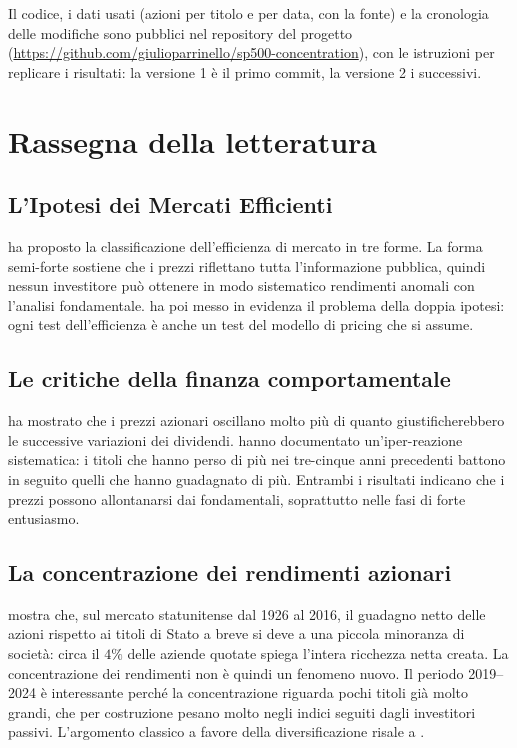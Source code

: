 \documentclass[12pt, a4paper]{article}
\begin{document}
Il codice, i dati usati (azioni per titolo e per data, con la fonte) e la cronologia delle modifiche sono pubblici nel repository del progetto (\url{https://github.com/giulioparrinello/sp500-concentration}), con le istruzioni per replicare i risultati: la versione 1 \`e il primo commit, la versione 2 i successivi.

\section{Rassegna della letteratura}

\subsection{L'Ipotesi dei Mercati Efficienti}

\citet{fama1970} ha proposto la classificazione dell'efficienza di mercato in tre forme. La forma semi-forte sostiene che i prezzi riflettano tutta l'informazione pubblica, quindi nessun investitore pu\`o ottenere in modo sistematico rendimenti anomali con l'analisi fondamentale. \citet{fama1991} ha poi messo in evidenza il problema della doppia ipotesi: ogni test dell'efficienza \`e anche un test del modello di pricing che si assume.

\subsection{Le critiche della finanza comportamentale}

\citet{shiller1981} ha mostrato che i prezzi azionari oscillano molto pi\`u di quanto giustificherebbero le successive variazioni dei dividendi. \citet{debondt1985} hanno documentato un'iper-reazione sistematica: i titoli che hanno perso di pi\`u nei tre-cinque anni precedenti battono in seguito quelli che hanno guadagnato di pi\`u. Entrambi i risultati indicano che i prezzi possono allontanarsi dai fondamentali, soprattutto nelle fasi di forte entusiasmo.

\subsection{La concentrazione dei rendimenti azionari}

\citet{bessembinder2018} mostra che, sul mercato statunitense dal 1926 al 2016, il guadagno netto delle azioni rispetto ai titoli di Stato a breve si deve a una piccola minoranza di societ\`a: circa il $4\%$ delle aziende quotate spiega l'intera ricchezza netta creata. La concentrazione dei rendimenti non \`e quindi un fenomeno nuovo. Il periodo 2019--2024 \`e interessante perch\'e la concentrazione riguarda pochi titoli gi\`a molto grandi, che per costruzione pesano molto negli indici seguiti dagli investitori passivi. L'argomento classico a favore della diversificazione risale a \citet{markowitz1952}.
\end{document}
